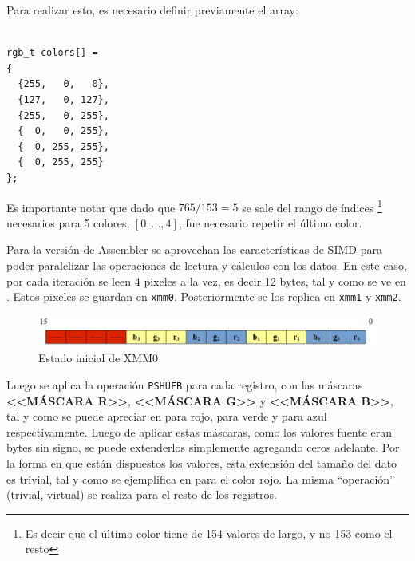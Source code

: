 \newpage
Para realizar esto, es necesario definir previamente el array:
\begin{center}\begin{minipage}{10em}\begin{codesnippet}\begin{verbatim}

rgb_t colors[] =
{
  {255,   0,   0},
  {127,   0, 127},
  {255,   0, 255},
  {  0,   0, 255},
  {  0, 255, 255},
  {  0, 255, 255}
};

\end{verbatim}\end{codesnippet}\end{minipage}\end{center}  

Es importante notar que dado que $765/153=5$ se sale del rango de índices
\footnote{Es decir que el último color tiene de 154 valores de largo, y no 153
como el resto} necesarios para 5 colores, $[0,\dots,4]$, fue necesario repetir
el último color.

Para la versión de Assembler se aprovechan las características de SIMD para
poder paralelizar las operaciones de lectura y cálculos con los datos. En este
caso, por cada iteración se leen 4 pixeles a la vez, es decir 12 bytes, tal y
como se ve en . Estos pixeles se guardan en \texttt{xmm0}.
Posteriormente se los replica en \texttt{xmm1} y \texttt{xmm2}.

\begin{figure}[h]
  \begin{center}
  \includegraphics[scale=0.66]{imagenes/popart1.png}
  \caption{Estado inicial de XMM0}
  \label{fig:popart1}
  \end{center}
\end{figure}

Luego se aplica la operación \texttt{PSHUFB} para cada registro, con las
máscaras \textbf{<<MÁSCARA R>>}, \textbf{<<MÁSCARA G>>} y \textbf{<<MÁSCARA
B>>}, tal y como se puede apreciar en  para rojo,
 para verde y  para azul respectivamente.
Luego de aplicar estas máscaras, como los valores fuente eran bytes sin signo,
se puede extenderlos simplemente agregando ceros adelante. Por la forma en que
están dispuestos los valores, esta extensión del tamaño del dato es trivial, tal
y como se ejemplifica en  para el color rojo. La misma
``operación'' (trivial, virtual) se realiza para el resto de los registros.

